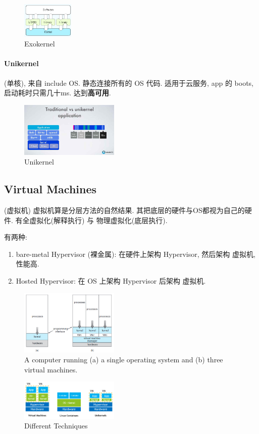 \begin{figure}[!htb]
    \centering
    \includegraphics[width=0.22\textwidth]{pic/OS2/Exokernel.png}
    \caption{Exokernel}
\end{figure}

\paragraph{Unikernel} (单核), 来自 include OS. 静态连接所有的 OS 代码. 适用于云服务, app 的 boots, 启动耗时只需几十ms. 达到\textbf{高可用}.  

\begin{figure}[!htb]
    \centering
    \includegraphics[width=0.42\textwidth]{pic/OS2/Unikernel.png}
    \caption{Unikernel}
\end{figure}


\subsection{Virtual Machines}
(虚拟机) 虚拟机算是分层方法的自然结果. 其把底层的硬件与OS都视为自己的硬件. 有全虚拟化(解释执行) 与 物理虚拟化(底层执行). 

有两种:
\begin{enumerate}
    \item bare-metal Hypervisor (裸金属): 在硬件上架构 Hypervisor, 然后架构 虚拟机, 性能高. 
    \item Hosted Hypervisor: 在 OS 上架构 Hypervisor 后架构 虚拟机. 
\end{enumerate}

\begin{figure}[!htb]
    \centering
    \includegraphics[width=0.42\textwidth]{pic/OS2/virtual machines..png}
    \caption{A computer running (a) a single operating system and (b) three virtual machines.}
\end{figure}

\begin{figure}[!htb]
    \centering
    \includegraphics[width=0.42\textwidth]{pic/OS2/Different Techniques}
    \caption{Different Techniques}
\end{figure}
\newpage
\quad



